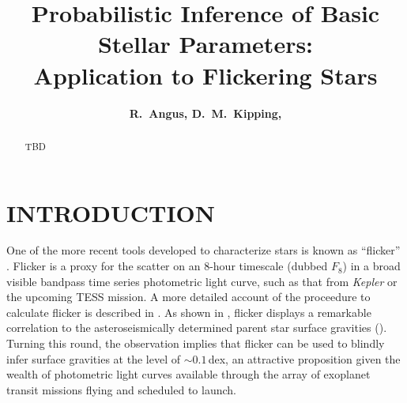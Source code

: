 \documentclass[apjl]{emulateapj}
\newcommand{\titledag}{$\dagger$}
\newcommand{\titledag}{\dagger}
\begin{document}
\title {Probabilistic Inference of Basic Stellar Parameters:\\
Application to Flickering Stars %
\altaffilmark{\titledag}}

\author{
	{\bf	R.~Angus,
		D.~M.~Kipping,
	}
}







\begin{abstract}

TBD

\end{abstract}



\section{INTRODUCTION}
\label{sec:intro}



One of the more recent tools developed to characterize stars is known as 
``flicker'' \citep{bastien:2013}. Flicker is a proxy for the scatter on an 
8-hour timescale (dubbed $F_8$) in a broad visible bandpass time series 
photometric light curve, such as that from \textit{Kepler} or the upcoming TESS 
mission. A more detailed account of the proceedure to calculate flicker is 
described in \citet{bastien:2013}. As shown in \citet{bastien:2013}, flicker 
displays a remarkable correlation to the asteroseismically determined parent 
star surface gravities (\logg). Turning this round, the observation implies 
that flicker can be used to blindly infer surface gravities at the level of 
$\sim0.1$\,dex, an attractive proposition given the wealth of photometric light 
curves available through the array of exoplanet transit missions flying and 
scheduled to launch.
\end{document}
